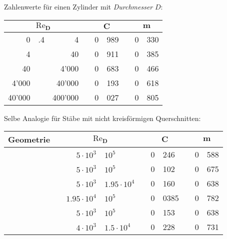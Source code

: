 			Zahlenwerte für einen Zylinder mit \emph{Durchmesser} $D$:
			\begin{center}
				\begin{tabular}{r@{}l@{$\:-\:$}rcr@{.}lcr@{.}l}
					\toprule
					\multicolumn{3}{c}{$\boldsymbol{\mathrm{Re}_D}$} && \multicolumn{2}{c}{$\boldsymbol C$} && \multicolumn{2}{c}{$\boldsymbol m$} \\
					\midrule
					     0 & .4 & 4       && 0 & 989 && 0 & 330 \\
					     4 &    & 40      && 0 & 911 && 0 & 385 \\
					    40 &    & 4'000   && 0 & 683 && 0 & 466 \\
					 4'000 &    & 40'000  && 0 & 193 && 0 & 618 \\
					40'000 &    & 400'000 && 0 & 027 && 0 & 805 \\
					\bottomrule
				\end{tabular}
			\end{center}
			
			Selbe Analogie für Stäbe mit nicht kreisförmigen Querschnitten:
			\begin{center}
				\begin{tabular}{@{}p{.6cm}@{}m{.9cm}@{}m{.15cm}cr@{$\:-\:$}lcr@{.}lcr@{.}l@{}}
					\toprule
					\multicolumn{3}{c}{\textbf{Geometrie}} && \multicolumn{2}{c}{$\boldsymbol{\mathrm{Re}_D}$} && \multicolumn{2}{c}{$\boldsymbol C$} && \multicolumn{2}{c}{$\boldsymbol m$} \\
					\midrule
					&&  && $5 \cdot 10^3$ & $10^5$ && 0&246 && 0&588 \\
					\midrule
					& &  && $5 \cdot 10^3$ & $10^5$ && 0&102 && 0&675 \\
					\midrule
					\multirow{2}{*}{}&\multirow{2}{*}{} &\multirow{2}{*}{} && $5 \cdot 10^3$ & $1.95 \cdot 10^4$ && 0&160 && 0&638 \\
					& & && $1.95 \cdot 10^4$ & $10^5$ && 0&0385 && 0&782 \\
					\midrule
					& & && $5 \cdot 10^3$ & $10^5$ && 0&153 && 0&638 \\
					\midrule
					& & && $4 \cdot 10^3$ & $1.5 \cdot 10^4$ && 0&228 && 0&731 \\
					\bottomrule
				\end{tabular}
			\end{center}

